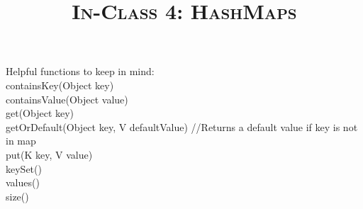 \documentclass{article}
\title{\large{\textsc{In-Class 4: HashMaps}}}
\date{}
\begin{document}
    \maketitle

    \subsection*{}
    \vspace{-15 mm}
    Helpful functions to keep in mind:\\
    \indent containsKey(Object key)\\
    \indent containsValue(Object value)\\
    \indent get(Object key)\\
    \indent getOrDefault(Object key, V defaultValue) //Returns a default value if key is not in map\\
    \indent put(K key, V value)\\
    \indent keySet()\\
    \indent values()\\
	\indent size()\\
    \subsection*{}
    \vspace{-10 mm}
\end{document}
